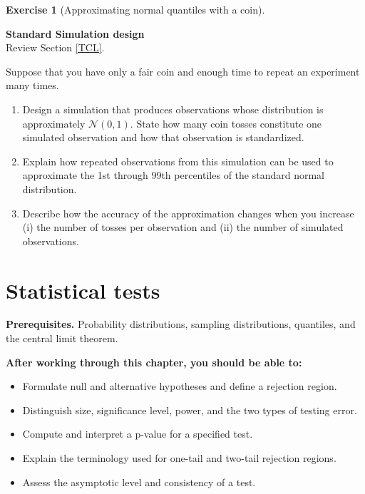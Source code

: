 \documentclass[
  11pt,
]{book}
\providecommand{\tightlist}{%
  \setlength{\itemsep}{0pt}\setlength{\parskip}{0pt}}
\theoremstyle{definition}
\theoremstyle{definition}
\theoremstyle{definition}
\newtheorem{exercise}{Exercise}[chapter]
\theoremstyle{definition}
\theoremstyle{remark}
\begin{document}
\begin{exercisebox}

\begin{exercise}[Approximating normal quantiles with a coin]
\protect\hypertarget{exr:clt-coin-normal-quantiles}{}\label{exr:clt-coin-normal-quantiles}

\textbf{Standard \textbar{} Simulation design}\\
Review Section \ref{TCL}.

Suppose that you have only a fair coin and enough time to repeat an experiment many times.

\begin{enumerate}
\def\labelenumi{\arabic{enumi}.}
\tightlist
\item
  Design a simulation that produces observations whose distribution is approximately \(\mathcal{N}(0,1)\). State how many coin tosses constitute one simulated observation and how that observation is standardized.
\item
  Explain how repeated observations from this simulation can be used to approximate the 1st through 99th percentiles of the standard normal distribution.
\item
  Describe how the accuracy of the approximation changes when you increase (i) the number of tosses per observation and (ii) the number of simulated observations.
\end{enumerate}

\end{exercise}

\end{exercisebox}

\chapter{Statistical tests}\label{Tests}

\textbf{Prerequisites.} Probability distributions, sampling distributions, quantiles, and the central limit theorem.

\textbf{After working through this chapter, you should be able to:}

\begin{itemize}
\tightlist
\item
  Formulate null and alternative hypotheses and define a rejection region.
\item
  Distinguish size, significance level, power, and the two types of testing error.
\item
  Compute and interpret a p-value for a specified test.
\item
  Explain the terminology used for one-tail and two-tail rejection regions.
\item
  Assess the asymptotic level and consistency of a test.
\end{itemize}
\end{document}
